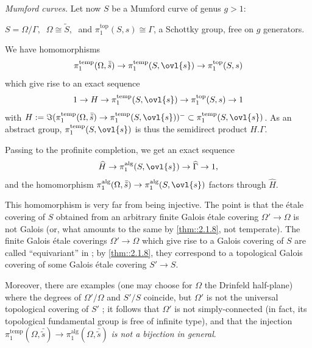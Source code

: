 \begin{para}
 \label{para::2.3.3} {\it Mumford curves.} Let now $S$ be a Mumford
 curve of genus $g>1$:

 \noindent $S=\Omega/\Gamma,\;
 \;\Omega\cong \tilde S,\;$ and $\pi_1^{\mathrm{top}}(S,s)\cong \Gamma$,
 a Schottky group, free on $g$ generators.

 \noindent We have homomorphisms 
 \begin{equation*}
 \pi_1^{\mathrm{temp}}(\Omega,\bar{\tilde s})\to
  \pi_1^{\mathrm{temp}}(S,\ovl{s})\to  \pi_1^{\mathrm{top}}(S,s)
 \end{equation*}
 which give rise to an exact sequence  
 \begin{equation*}
 1\to H \to \pi_1^{\mathrm{temp}}(S,\ovl{s})\to 
 \pi_1^{\mathrm{top}}(S,s) \to 1 
 \end{equation*}
 with $H:= \Im(\pi_1^{\mathrm{temp}}(\Omega,\bar{\tilde
 s})\to \pi_1^{\mathrm{temp}}(S,\ovl{s}))^-\subset
 \pi_1^{\mathrm{temp}}(S,\ovl{s}) $. As an abstract group,
 $\pi_1^{\mathrm{temp}}(S,\ovl{s})$ is thus the semidirect product
 $H.\Gamma$.
 
 \noindent Passing to the profinite completion, we get an exact sequence
 \begin{equation*}
  \widehat{H} \to \pi_1^{\mathrm{alg}}(S,\ovl{s})\to 
 \widehat{\Gamma} \to 1, 
 \end{equation*}
 and the homomorphism
 $\pi_1^{\mathrm{alg}}(\Omega,\bar{\tilde s})\to
 \pi_1^{\mathrm{alg}}(S,\ovl{s})$ factors through 
 $\widehat{H}$. 

 \medskip This homomorphism is very far from being injective. The point
 is that the \'etale covering of $S$ obtained from an arbitrary finite
 Galois \'etale covering $\Omega'\to \Omega$ is not Galois (or, what
 amounts to the same by \ref{thm::2.1.8}, not temperate). The finite
 Galois \'etale coverings $\Omega'\to \Omega$ which give rise to a
 Galois covering of $S$ are called ``equivariant'' in \cite[1.3]{ecoamc}; 
 by \ref{thm::2.1.8}, they 
 correspond to a topological Galois covering of some Galois \'etale
 covering $S'\to S$.

 Moreover, there are examples \cite[2.7]{ecoamc} (one may choose for $\Omega$
 the Drinfeld half-plane) where the degrees of $\Omega'/
 \Omega$ and $S'/ S$ coincide, but $\Omega'$ is not the universal
 topological covering of $S'$ ; it follows that $\Omega'$ 
 is not simply-connected (in fact, its topological fundamental group is
 free of infinite type), and that the injection 
 $\pi_1^{\mathrm{temp}}(\Omega,\bar{\tilde s})\to
 \pi_1^{\mathrm{alg}}(\Omega,\bar{\tilde s})$ {\it is not a bijection in
 general}.


\end{para}
